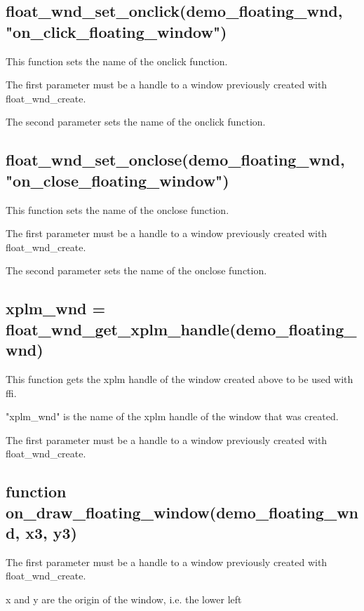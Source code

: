 \documentclass[11pt,parskip=half,a4paper]{scrartcl}
\begin{document}
\subsection{\hspace*{1.0mm}float\_wnd\_set\_onclick(demo\_floating\_wnd, "on\_click\_floating\_window")}

This function sets the name of the onclick function.

The first parameter must be a handle to a window previously created with float\_wnd\_create.

The second parameter sets the name of the onclick function.

\subsection{\hspace*{1.0mm}float\_wnd\_set\_onclose(demo\_floating\_wnd, "on\_close\_floating\_window")}

This function sets the name of the onclose function.

The first parameter must be a handle to a window previously created with float\_wnd\_create.

The second parameter sets the name of the onclose function.

\subsection{\hspace*{1.0mm}xplm\_wnd = float\_wnd\_get\_xplm\_handle(demo\_floating\_wnd)}

This function gets the xplm handle of the window created above to be used with ffi.

"xplm\_wnd" is the name of the xplm handle of the window that was created.

The first parameter must be a handle to a window previously created with float\_wnd\_create.

\subsection{\hspace*{1.0mm}function on\_draw\_floating\_window(demo\_floating\_wnd, x3, y3)}

The first parameter must be a handle to a window previously created with float\_wnd\_create.

x and y are the origin of the window, i.e. the lower left
\end{document}
